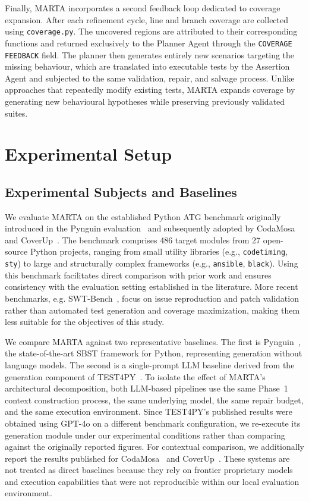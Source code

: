\documentclass{llncs}
\begin{document}
Finally, MARTA incorporates a second feedback loop dedicated to coverage expansion. After each refinement cycle, line and branch coverage are collected using \texttt{coverage.py}. The uncovered regions are attributed to their corresponding functions and returned exclusively to the Planner Agent through the \texttt{COVERAGE FEEDBACK} field. The planner then generates entirely new scenarios targeting the missing behaviour, which are translated into executable tests by the Assertion Agent and subjected to the same validation, repair, and salvage process. Unlike approaches that repeatedly modify existing tests, MARTA expands coverage by generating new behavioural hypotheses while preserving previously validated suites.



\section{Experimental Setup}
\label{sec:exp}

\subsection{Experimental Subjects and Baselines}

We evaluate MARTA on the established Python ATG benchmark originally introduced in the Pynguin evaluation~\cite{lukasczyk2022pynguin} and subsequently adopted by CodaMosa~\cite{lemieux2023codamosa} and CoverUp~\cite{altmayer2025coverup}. The benchmark comprises 486 target modules from 27 open-source Python projects, ranging from small utility libraries (e.g., \texttt{codetiming}, \texttt{sty}) to large and structurally complex frameworks (e.g., \texttt{ansible}, \texttt{black}). Using this benchmark facilitates direct comparison with prior work and ensures consistency with the evaluation setting established in the literature. More recent benchmarks, e.g. SWT-Bench~\cite{muendler2024swtbench}, focus on issue reproduction and patch validation rather than automated test generation and coverage maximization, making them less suitable for the objectives of this study.

We compare MARTA against two representative baselines. The first is Pynguin~\cite{lukasczyk2022pynguin}, the state-of-the-art SBST framework for Python, representing generation without language models. The second is a single-prompt LLM baseline derived from the generation component of TEST4PY~\cite{test4py2025}. To isolate the effect of MARTA's architectural decomposition, both LLM-based pipelines use the same Phase~1 context construction process, the same underlying model, the same repair budget, and the same execution environment. Since TEST4PY's published results were obtained using GPT-4o on a different benchmark configuration, we re-execute its generation module under our experimental conditions rather than comparing against the originally reported figures.
For contextual comparison, we additionally report the results published for CodaMosa~\cite{lemieux2023codamosa} and CoverUp~\cite{altmayer2025coverup}. These systems are not treated as direct baselines because they rely on frontier proprietary models and execution capabilities that were not reproducible within our local evaluation environment.
\end{document}
